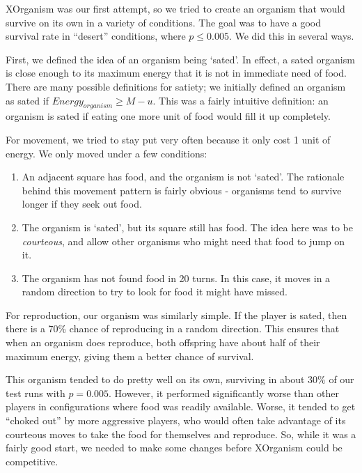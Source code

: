 \documentclass[
10pt, %
letterpaper, %
oneside, %
headinclude,footinclude, %
english
]{article}
\begin{document}
XOrganism was our first attempt, so we tried to create an organism that would survive on its own in a variety of conditions. The goal was to have a good survival rate in ``desert'' conditions, where $p \leq 0.005$. We did this in several ways.

First, we defined the idea of an organism being `sated'. In effect, a sated organism is close enough to its maximum energy that it is not in immediate need of food. There are many possible definitions for satiety; we initially defined an organism as sated if $Energy_{organism} \geq M - u$. This was a fairly intuitive definition: an organism is sated if eating one more unit of food would fill it up completely.

For movement, we tried to stay put very often because it only cost 1 unit of energy. We only moved under a few conditions:
\begin{enumerate}
  \item An adjacent square has food, and the organism is not `sated'. The rationale behind this movement pattern is fairly obvious - organisms tend to survive longer if they seek out food.
  \item The organism is `sated', but its square still has food. The idea here was to be \textit{courteous}, and allow other organisms who might need that food to jump on it.
  \item The organism has not found food in 20 turns. In this case, it moves in a random direction to try to look for food it might have missed.
\end{enumerate}
For reproduction, our organism was similarly simple. If the player is sated, then there is a 70\% chance of reproducing in a random direction. This ensures that when an organism does reproduce, both offspring have about half of their maximum energy, giving them a better chance of survival.

This organism tended to do pretty well on its own, surviving in about 30\% of our test runs with $p=0.005$. However, it performed significantly worse than other players in configurations where food was readily available. Worse, it tended to get ``choked out'' by more aggressive players, who would often take advantage of its courteous moves to take the food for themselves and reproduce. So, while it was a fairly good start, we needed to make some changes before XOrganism could be competitive.
\end{document}

